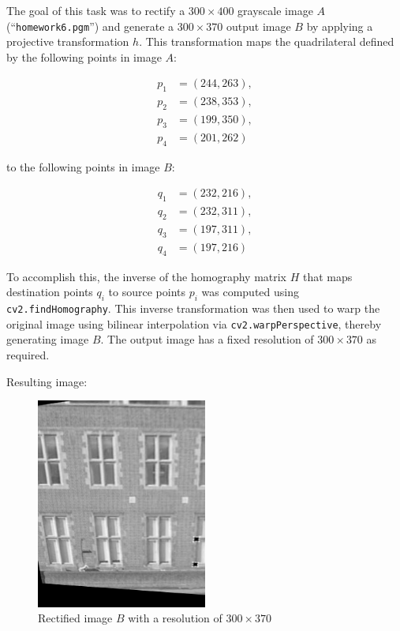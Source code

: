 The goal of this task was to rectify a \(300 \times 400\) grayscale image \(A\) (``\texttt{homework6.pgm}'') and generate a \(300 \times 370\) output image \(B\) by applying a projective transformation \(h\). This transformation maps the quadrilateral defined by the following points in image \(A\):

\[
\begin{aligned}
p_1 &= (244, 263), \\
p_2 &= (238, 353), \\
p_3 &= (199, 350), \\
p_4 &= (201, 262)
\end{aligned}
\]

to the following points in image \(B\):

\[
\begin{aligned}
q_1 &= (232, 216), \\
q_2 &= (232, 311), \\
q_3 &= (197, 311), \\
q_4 &= (197, 216)
\end{aligned}
\]

To accomplish this, the inverse of the homography matrix \(H\) that maps destination points \(q_i\) to source points \(p_i\) was computed using \texttt{cv2.findHomography}. This inverse transformation was then used to warp the original image using bilinear interpolation via \texttt{cv2.warpPerspective}, thereby generating image \(B\). The output image has a fixed resolution of \(300 \times 370\) as required.

Resulting image:
\begin{figure}[H]
    \centering
    \includegraphics[width=0.5\textwidth]{../Images/homework6.png}
    \caption{Rectified image \(B\) with a resolution of \(300 \times 370\)}
\end{figure}
